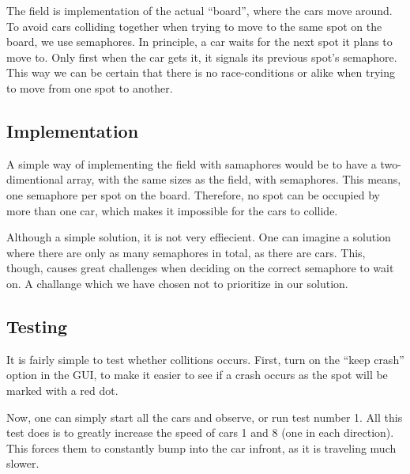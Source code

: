 
The field is implementation of the actual ``board'', where the cars move
around. To avoid cars colliding together when trying to move to the
same spot on the board, we use semaphores. In principle, a car waits
for the next spot it plans to move to. Only first when the car gets
it, it signals its previous spot's semaphore. This way we can be
certain that there is no race-conditions or alike when trying to move
from one spot to another.


\subsection{Implementation}
\label{sub:field-impl}
A simple way of implementing the field with samaphores would be to
have a two-dimentional array, with the same sizes as the field, with
semaphores. This means, one semaphore per spot on the
board. Therefore, no spot can be occupied by more than one car, which
makes it impossible for the cars to collide.

Although a simple solution, it is not very effiecient. One can imagine
a solution where there are only as many semaphores in total, as there
are cars. This, though, causes great challenges when deciding on the
correct semaphore to wait on. A challange which we have chosen not to
prioritize in our solution.


\subsection{Testing}
\label{sub:field-test}
It is fairly simple to test whether collitions occurs. First, turn on
the ``keep crash'' option in the GUI, to make it easier to see if a
crash occurs as the spot will be marked with a red dot.

Now, one can simply start all the cars and observe, or run test number
1. All this test does is to greatly increase the speed of cars 1 and 8
(one in each direction). This forces them to constantly bump into the
car infront, as it is traveling much slower.
